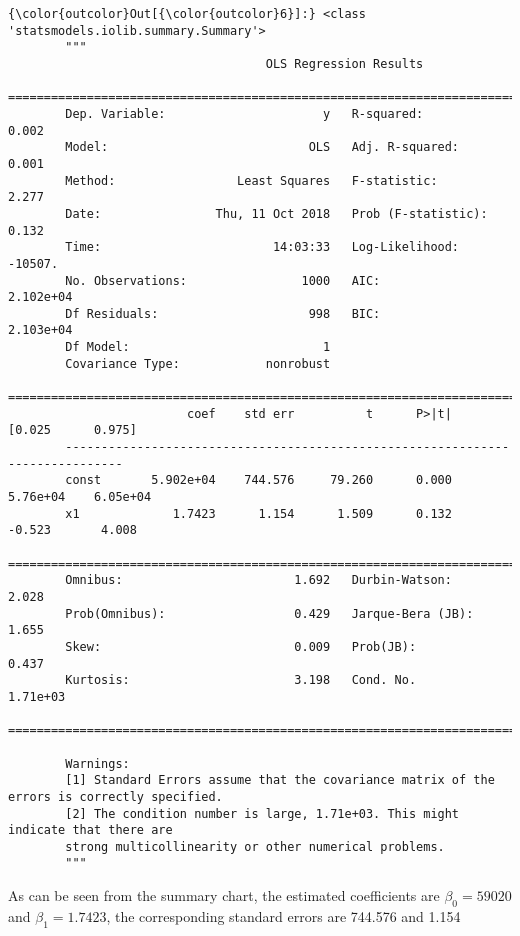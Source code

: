 \documentclass[11pt]{article}
\begin{document}
\begin{Verbatim}[commandchars=\\\{\}]
{\color{outcolor}Out[{\color{outcolor}6}]:} <class 'statsmodels.iolib.summary.Summary'>
        """
                                    OLS Regression Results                            
        ==============================================================================
        Dep. Variable:                      y   R-squared:                       0.002
        Model:                            OLS   Adj. R-squared:                  0.001
        Method:                 Least Squares   F-statistic:                     2.277
        Date:                Thu, 11 Oct 2018   Prob (F-statistic):              0.132
        Time:                        14:03:33   Log-Likelihood:                -10507.
        No. Observations:                1000   AIC:                         2.102e+04
        Df Residuals:                     998   BIC:                         2.103e+04
        Df Model:                           1                                         
        Covariance Type:            nonrobust                                         
        ==============================================================================
                         coef    std err          t      P>|t|      [0.025      0.975]
        ------------------------------------------------------------------------------
        const       5.902e+04    744.576     79.260      0.000    5.76e+04    6.05e+04
        x1             1.7423      1.154      1.509      0.132      -0.523       4.008
        ==============================================================================
        Omnibus:                        1.692   Durbin-Watson:                   2.028
        Prob(Omnibus):                  0.429   Jarque-Bera (JB):                1.655
        Skew:                           0.009   Prob(JB):                        0.437
        Kurtosis:                       3.198   Cond. No.                     1.71e+03
        ==============================================================================
        
        Warnings:
        [1] Standard Errors assume that the covariance matrix of the errors is correctly specified.
        [2] The condition number is large, 1.71e+03. This might indicate that there are
        strong multicollinearity or other numerical problems.
        """
\end{Verbatim}
            
    As can be seen from the summary chart, the estimated coefficients are
\(\beta_0=59020\) and \(\beta_1=1.7423\), the corresponding standard
errors are 744.576 and 1.154
\end{document}
